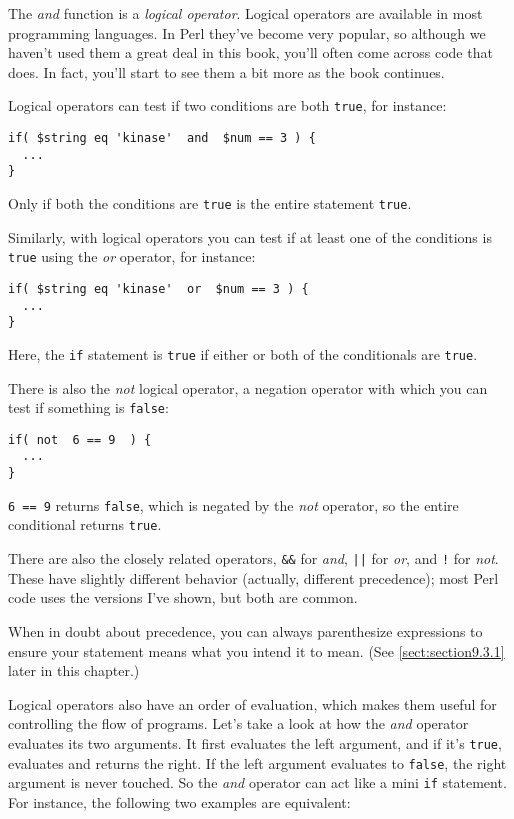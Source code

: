 The \textit{and} function is a \textit{logical operator}. Logical operators are available in most programming languages. In Perl they've become very popular, so although we haven't used them a great deal in this book, you'll often come across code that does. In fact, you'll start to see them a bit more as the book continues.

Logical operators can test if two conditions are both \verb|true|, for instance:

\begin{lstlisting}
if( $string eq 'kinase'  and  $num == 3 ) {
  ...
}
\end{lstlisting}

Only if both the conditions are \verb|true| is the entire statement \verb|true|.

Similarly, with logical operators you can test if at least one of the conditions is \verb|true| using the \textit{or} operator, for instance: 

\begin{lstlisting}
if( $string eq 'kinase'  or  $num == 3 ) {
  ...
}
\end{lstlisting}

Here, the \verb|if| statement is \verb|true| if either or both of the conditionals are \verb|true|.

There is also the \textit{not} logical operator, a negation operator with which you can test if something is \verb|false|: 

\begin{lstlisting}
if( not  6 == 9  ) {
  ...
}
\end{lstlisting}

\verb|6 == 9| returns \verb|false|, which is negated by the \textit{not} operator, so the entire conditional returns \verb|true|.

There are also the closely related operators, \verb=&&= for \textit{and}, \verb=||= for \textit{or}, and \verb=!= for \textit{not}. These have slightly different behavior (actually, different precedence); most Perl code uses the versions I've shown, but both are common.

When in doubt about precedence, you can always parenthesize expressions to ensure your statement means what you intend it to mean. (See \autoref{sect:section9.3.1} later in this chapter.)

Logical operators also have an order of evaluation, which makes them useful for controlling the flow of programs. Let's take a look at how the \textit{and} operator evaluates its two arguments. It first evaluates the left argument, and if it's \verb|true|, evaluates and returns the right. If the left argument evaluates to \verb|false|, the right argument is never touched. So the \textit{and} operator can act like a mini \verb|if| statement. For instance, the following two examples are equivalent: 

